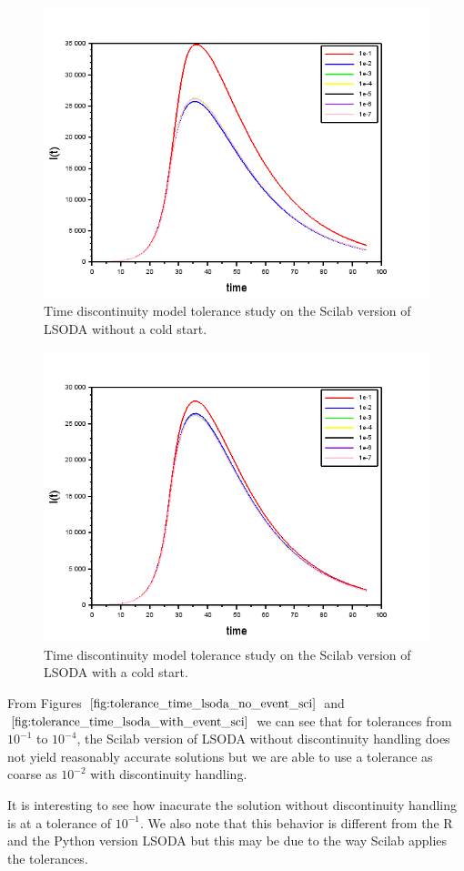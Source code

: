 \begin{figure}[H]
\centering
\includegraphics[width=0.7\linewidth]{./figures/tolerance_time_lsoda_no_event_sci}
\caption{Time discontinuity model tolerance study on the Scilab version of LSODA without a cold start.}
\label{fig:tolerance_time_lsoda_no_event_sci}
\end{figure}

\begin{figure}[H]
\centering
\includegraphics[width=0.7\linewidth]{./figures/tolerance_time_lsoda_with_event_sci}
\caption{Time discontinuity model tolerance study on the Scilab version of LSODA with a cold start.}
\label{fig:tolerance_time_lsoda_with_event_sci}
\end{figure}

From Figures $\ref{fig:tolerance_time_lsoda_no_event_sci}$ and $\ref{fig:tolerance_time_lsoda_with_event_sci}$ we can see that for tolerances from $10^{-1}$ to $10^{-4}$, the Scilab version of LSODA without discontinuity handling does not yield reasonably accurate solutions but we are able to use a tolerance as coarse as $10^{-2}$ with discontinuity handling. 

It is interesting to see how inacurate the solution without discontinuity handling is at a tolerance of $10^{-1}$. We also note that this behavior is different from the R and the Python version LSODA but this may be due to the way Scilab applies the tolerances.

